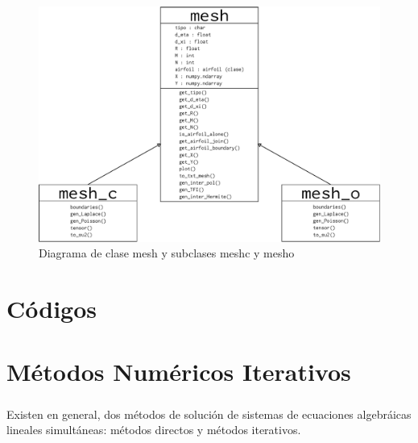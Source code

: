 \documentclass[letterpaper, openright, 12pt]{book}
\begin{document}

    \begin{figure}
        \centering
        \includegraphics[width=205mm]{./Imagenes/mesh_class}
        \caption{Diagrama de clase mesh y subclases mesh\textunderscore c y
            mesh\textunderscore o}
    \end{figure}
%
%
%
%
%

%
%
%
%
%
\appendix
\chapter{Códigos}\label{appCode}
%
%
%
%
%

%
%
%
%
%
\chapter{Métodos Numéricos Iterativos}\label{appIter}
    \paragraph*{}
        Existen en general, dos métodos de solución de sistemas de ecuaciones
        algebráicas lineales simultáneas: métodos directos y métodos iterativos.
\end{document}
